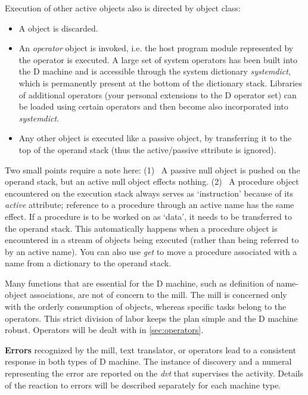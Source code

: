 Execution  of other active objects also is directed by object class:
\begin{itemize}
\item A  object is discarded.
\item An \emph{operator}  object  is  invoked, i.e.  the  host  program  module represented  by the operator is executed.  A large set of system operators has been built into the D machine and is accessible through the system dictionary \emph{systemdict}, which is permanently present at the bottom of the dictionary stack. Libraries of additional operators (your personal extensions to the D operator set) can be loaded using certain operators and then become also incorporated into \emph{systemdict}.
\item Any other object is executed like a passive object,  by  transferring it to the top of the operand stack (thus the active/passive sttribute is ignored).
\end{itemize}

Two small points require a note here:  (1)~ A passive null object is pushed  on the  operand  stack,  but  an active null  object  effects  nothing.  (2)~ A procedure object  encountered on the execution stack always  serves  as `instruction' because of its \emph{active} attribute;  reference to a  procedure through  an  active name has the same effect.  If a procedure  is  to  be worked  on  as `data',  it needs to be transferred to the  operand  stack. This automatically happens when a procedure object is encountered in a stream of objects being executed (rather than being referred to by an active name). You can also use \emph{get} to move a procedure associated with a name from a dictionary to the operand stack.

Many functions that are essential for the D machine,  such as definition of name-object associations,  are not of concern to the mill. The mill is concerned only with the orderly consumption of objects,  whereas specific tasks   belong  to  the  operators.   This  strict  division   of   labor keeps  the plan simple and the D machine robust.  Operators will  be  dealt with in \ref{sec:operators}.

\textbf{Errors} recognized by the  mill,  text  translator,  or operators  lead  to a consistent response in both types of D machine. The instance  of  discovery and a numeral representing the  error are reported on the \emph{dvt} that supervises the activity. Details of the reaction to errors will be described separately for each machine type.

